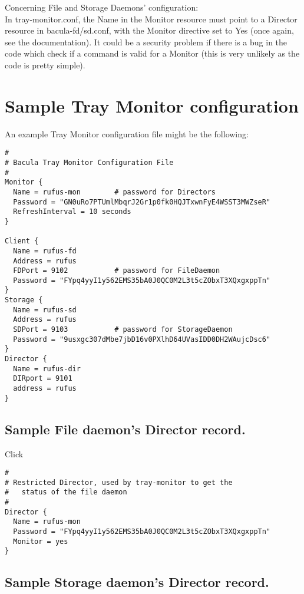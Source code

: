 Concerning File and Storage Daemons' configuration:\\
In tray-monitor.conf, the Name in the Monitor resource must point to a
Director resource in bacula-fd/sd.conf, with the Monitor directive set
to Yes (once again, see the documentation).
It could be a security problem if there is a bug in the code which check
if a command is valid for a Monitor (this is very unlikely as the code
is pretty simple).


\section{Sample Tray Monitor configuration}
\label{SampleConfiguration1}

An example Tray Monitor configuration file might be the following: 

\footnotesize
\begin{verbatim}
#
# Bacula Tray Monitor Configuration File
#
Monitor {
  Name = rufus-mon        # password for Directors
  Password = "GN0uRo7PTUmlMbqrJ2Gr1p0fk0HQJTxwnFyE4WSST3MWZseR"
  RefreshInterval = 10 seconds
}
   
Client {
  Name = rufus-fd
  Address = rufus
  FDPort = 9102           # password for FileDaemon
  Password = "FYpq4yyI1y562EMS35bA0J0QC0M2L3t5cZObxT3XQxgxppTn"
}
Storage {
  Name = rufus-sd
  Address = rufus
  SDPort = 9103           # password for StorageDaemon
  Password = "9usxgc307dMbe7jbD16v0PXlhD64UVasIDD0DH2WAujcDsc6"
}
Director {
  Name = rufus-dir
  DIRport = 9101
  address = rufus
}
\end{verbatim}
\normalsize

\subsection{Sample File daemon's Director record.}

Click 


\footnotesize
\begin{verbatim}
#
# Restricted Director, used by tray-monitor to get the
#   status of the file daemon
#
Director {
  Name = rufus-mon
  Password = "FYpq4yyI1y562EMS35bA0J0QC0M2L3t5cZObxT3XQxgxppTn"
  Monitor = yes
}
\end{verbatim}
\normalsize

\subsection{Sample Storage daemon's Director record.}


